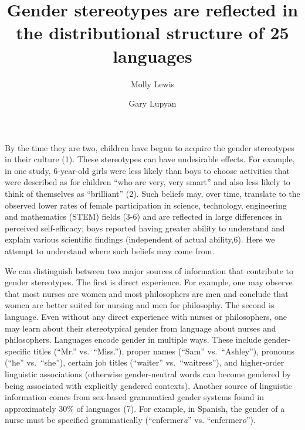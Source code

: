 \documentclass[9pt,twocolumn]{pnas-new}
\title{Gender stereotypes are reflected in the distributional structure of 25 languages}
\author[a,*]{Molly Lewis}
\author[b]{Gary Lupyan}
\affil[a]{Carnegie Mellon University, Psychology Department/Social and Decision Sciences, Pittsburgh, PA, USA}
\affil[b]{University of Wisconsin-Madison, Psychology Department, Madison, WI, USA}
\begin{document}
\maketitle
\thispagestyle{firststyle}


\let\thefootnote\relax{}

By the time they are two, children  have begun to acquire the
gender stereotypes in their culture (1). These
stereotypes can have undesirable effects. For example, in one study,
6-year-old girls were less likely than boys to choose activities that
were described as for children \enquote{who are very, very smart} and
also less likely to think of themselves as \enquote{brilliant}  (2). Such beliefs may, over time, translate to the observed lower rates of female participation in science, technology, engineering and mathematics (STEM) fields (3-6) and are reflected in large differences in perceived self-efficacy; boys reported having greater ability to understand and explain various scientific findings  (independent of actual ability,6).  Here we attempt to understand where such beliefs may come from.

We can distinguish between two major sources of information that contribute to gender stereotypes. The first is direct experience. For
example, one may observe that most nurses are women and most
philosophers are men and conclude that women are better suited for
nursing and men for philosophy. The second is language. Even without any
direct experience with nurses or philosophers, one may learn about their
stereotypical gender from language about nurses and philosophers.
Languages encode gender in multiple ways. These include gender-specific
titles (\enquote{Mr.} vs.\ \enquote{Miss.}), proper names (\enquote{Sam}
vs.\ \enquote{Ashley}), pronouns (\enquote{he} vs.\ \enquote{she}),
certain job titles (\enquote{waiter} vs.\ \enquote{waitress}), and
higher-order linguistic associations (otherwise gender-neutral words can
become gendered by being associated with explicitly gendered contexts).
Another source of linguistic information comes from sex-based
grammatical gender systems found in approximately 30\% of languages (7). For example, in Spanish, the gender of a
nurse must be specified grammatically (\enquote{enfermer\emph{a}} vs.
\enquote{enfermer\emph{o}}).
\end{document}

